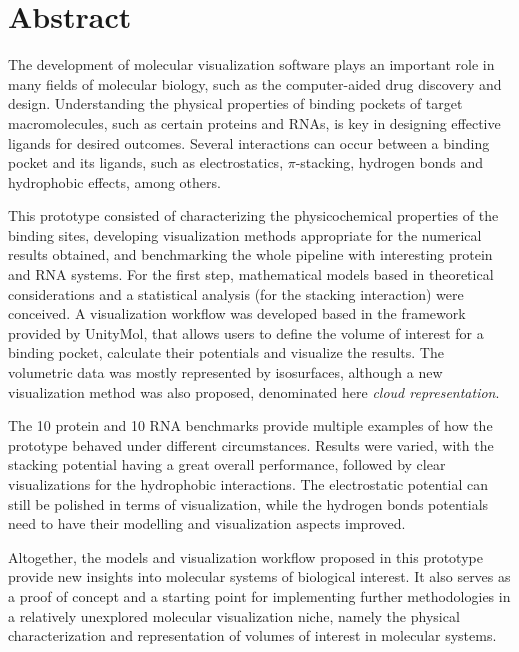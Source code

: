 \chapter*{Abstract} %

The development of molecular visualization software plays an important role in many fields of molecular biology, such as the computer-aided drug discovery and design. Understanding the physical properties of binding pockets of target macromolecules, such as certain proteins and RNAs, is key in designing effective ligands for desired outcomes. Several interactions can occur between a binding pocket and its ligands, such as electrostatics, $\pi$-stacking, hydrogen bonds and hydrophobic effects, among others.

This prototype consisted of characterizing the physicochemical properties of the binding sites, developing visualization methods appropriate for the numerical results obtained, and benchmarking the whole pipeline with interesting protein and RNA systems. For the first step, mathematical models based in theoretical considerations and a statistical analysis (for the stacking interaction) were conceived. A visualization workflow was developed based in the framework provided by UnityMol, that allows users to define the volume of interest for a binding pocket, calculate their potentials and visualize the results. The volumetric data was mostly represented by isosurfaces, although a new visualization method was also proposed, denominated here \textit{cloud representation}.

The 10 protein and 10 RNA benchmarks provide multiple examples of how the prototype behaved under different circumstances. Results were varied, with the stacking potential having a great overall performance, followed by clear visualizations for the hydrophobic interactions. The electrostatic potential can still be polished in terms of visualization, while the hydrogen bonds potentials need to have their modelling and visualization aspects improved.

Altogether, the models and visualization workflow proposed in this prototype provide new insights into molecular systems of biological interest. It also serves as a proof of concept and a starting point for implementing further methodologies in a relatively unexplored molecular visualization niche, namely the physical characterization and representation of volumes of interest in molecular systems.
